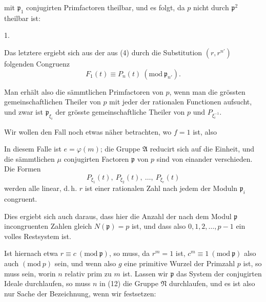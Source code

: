 mit $\mathfrak p_1$ conjugirten Primfactoren theilbar, und es folgt, da $p$ nicht
durch $\mathfrak p^2$ theilbar ist:

1. 

Das letztere ergiebt sich aus der aus (4) durch die Substitution
 $(r, r^{n'})$ folgenden Congruenz
\[
F_1(t) \equiv P_n(t) \ (\mathrm{mod}\ \mathfrak p_{n'}).
\]

Man erhält also die sämmtlichen Primfactoren von $p$, wenn
man die grössten gemeinschaftlichen Theiler von $p$ mit jeder
der rationalen Functionen
aufsucht, und zwar ist $\mathfrak p_{\xi_i}$ der grösste gemeinschaftliche Theiler
von $p$ und $P_{\xi_i^{-1}}$.

Wir wollen den Fall noch etwas näher betrachten, wo $f=1$
ist, also

In diesem Falle ist $e = \varphi(m)$; die Gruppe $\mathfrak A$ reducirt sich
auf die Einheit, und die sämmtlichen $\mu$ conjugirten Factoren $\mathfrak p$
von $p$ sind von einander verschieden. Die Formen
\[
P_{\xi_1}(t),\ P_{\xi_2}(t),\ \ldots,\ P_{\xi_e}(t)
\]
werden alle linear, d.\,h. $r$ ist einer rationalen Zahl nach jedem
der Moduln $\mathfrak p_i$ congruent.

Dies ergiebt sich auch daraus, dass hier die Anzahl der
nach dem Modul $\mathfrak p$ incongruenten Zahlen gleich $N(\mathfrak p) = p$ ist, und
dass also $0, 1, 2, \ldots, p-1$ ein volles Restsystem ist.

Ist hiernach etwa $r \equiv c \ (\mathrm{mod}\ \mathfrak p)$, so muss, da $r^m = 1$ ist,
$c^m \equiv 1 \ (\mathrm{mod}\ \mathfrak p)$ also auch $(\mathrm{mod}\ p)$ sein, und wenn also $g$ eine
primitive Wurzel der Primzahl $p$ ist, so muss
sein, worin $n$ relativ prim zu $m$ ist. Lassen wir $\mathfrak p$ das System
der conjugirten Ideale durchlaufen, so muss $n$ in (12) die
Gruppe $\mathfrak N$ durchlaufen, und es ist also nur Sache der Bezeichnung,
wenn wir festsetzen:
